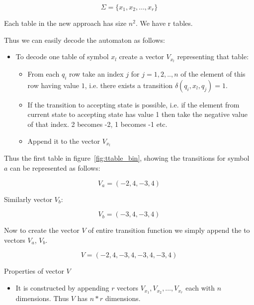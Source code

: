 \documentclass[runningheads,a4paper]{llncs}
\begin{document}
\begin{equation}
	\Sigma = \{x_1, x_2, \ldots, x_r\}
\end{equation}

Each table in the new approach has size $n^2$. We have r tables.

Thus we can easily decode the automaton as follows:
\begin{itemize}
\item To decode one table of symbol $x_l$ create a vector $V_{x_l}$ representing that table:
	\begin{itemize}
		\item From each $q_i$ row take an index $j$ for $j = 1,2,..,n$ of the element of this row having value $1$, i.e. there exists a transition $\delta(q_i, x_l, q_j) = 1$.
		\item If the transition to accepting state is possible, i.e. if the element from current state to accepting state has value 1 then take the negative value of that index. 2 becomes -2, 1 becomes -1 etc.
		\item Append it to the vector $V_{x_l}$
	\end{itemize}
\end{itemize}

Thus the first table in figure~\ref{fig:ttable_bin}, showing the transitions for symbol $a$ can be represented as follows:

\begin{equation}
	V_a = (-2, 4, -3, 4)
\end{equation}


Similarly vector $V_b$:

\begin{equation}
	V_b = (-3, 4, -3, 4)
\end{equation}

Now to create the vector $V$ of entire transition function we simply append the to vectors $V_a$, $V_b$.


\begin{equation}
	V = (-2,4,-3,4,-3,4,-3,4)
\end{equation}

Properties of vector $V$
\begin{itemize}
	\item It is constructed by appending $r$ vectors $V_{x_1}, V_{x_2}, \ldots, V_{x_{r}}$ each with $n$ dimensions. Thus $V$ has $n * r$ dimensions.
	
\end{itemize}
\end{document}
